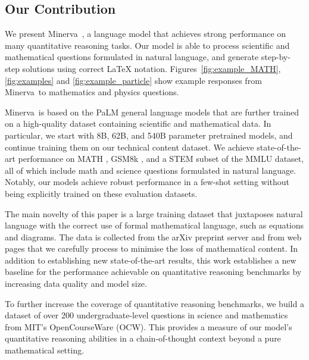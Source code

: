 \documentclass{article}
\newcommand{\ourmodel}[0]{{Minerva~}}
\newcommand{\pretrainedmodel}{{PaLM }}
\begin{document}
\subsection{Our Contribution}

We present \ourmodel\!\!, a language model that achieves strong performance on many quantitative reasoning tasks. Our model is able to process 
scientific and mathematical questions formulated in natural language, and generate step-by-step solutions using correct \LaTeX{} notation. 
Figures~\ref{fig:example_MATH}, \ref{fig:examples} and \ref{fig:example_particle} 
show example responses from \ourmodel to mathematics and physics questions.

\ourmodel is based on the \pretrainedmodel general language models \cite{palm} that are 
further trained on a high-quality dataset containing scientific and mathematical data.
In particular, we start with 8B, 62B, and 540B
parameter pretrained models, and continue training them on our technical content dataset.
We achieve state-of-the-art performance on MATH \cite{MATH}, GSM8k \cite{gsm8k}, and a STEM subset of the MMLU \cite{MMLU} dataset, all of which include math and science questions formulated in natural language. Notably, our models  achieve robust performance in a few-shot setting without being explicitly trained on these evaluation datasets.

The main novelty of this paper is a large training dataset that juxtaposes natural language with the correct use of formal mathematical language, such as equations and diagrams. 
The data is collected from the arXiv preprint server and from web pages that we carefully process to minimise the loss of mathematical content.  In addition to establishing new state-of-the-art results, this work establishes a new baseline for the performance achievable on quantitative reasoning benchmarks by increasing data quality and model size.

To further increase the coverage of quantitative reasoning benchmarks, 
we build a dataset of over 200 undergraduate-level questions in science and mathematics from MIT's OpenCourseWare (OCW). This provides a measure of our model's quantitative reasoning abilities in a chain-of-thought context beyond a pure mathematical setting.
\end{document}
